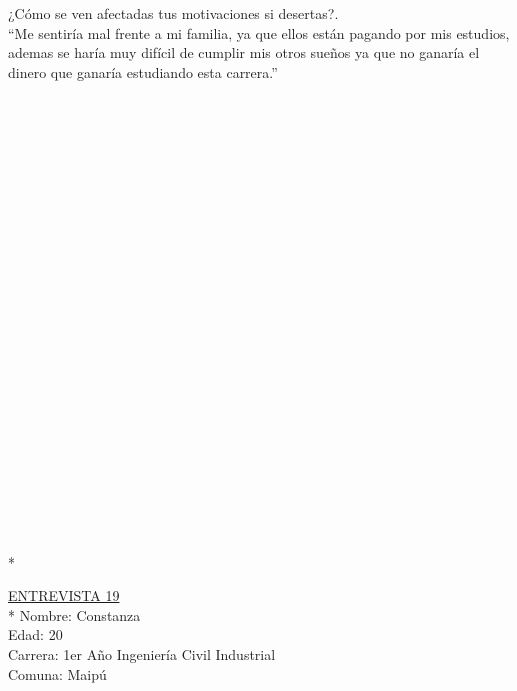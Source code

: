 ¿Cómo se ven afectadas tus motivaciones si desertas?.\\

``Me sentiría mal frente a mi familia, ya que ellos están pagando por mis estudios, ademas se haría muy difícil de cumplir mis otros sueños ya que no ganaría el dinero que ganaría estudiando esta carrera.''\\
\\
\\
\\
\\
\\
\\
\\
\\
\\
\\
\\
\\
\\
\\
\\
\\
\\
\\
\\
\\
\\
\\
\\
\\*

\underline {ENTREVISTA 19}\\*
Nombre: Constanza\\
Edad: 20\\
Carrera: 1er Año Ingeniería Civil Industrial\\
Comuna: Maipú\\


